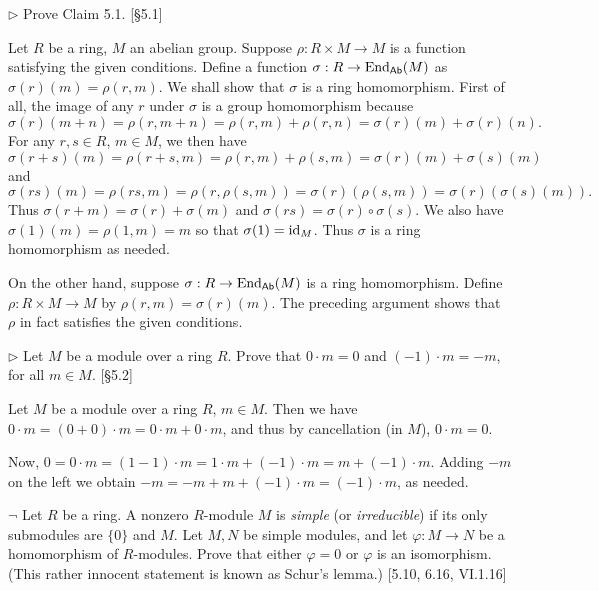 \begin{problem}
	$\triangleright$ Prove Claim 5.1. [\S 5.1]
\end{problem}

\begin{solution}
	Let $R$ be a ring, $M$ an abelian group. Suppose $\rho: R \times M \to M$ is a function satisfying the given conditions. Define a function $\sigma: R \to \mathrm{End}_{\mathsf{Ab}}(M)$ as $\sigma(r)(m) = \rho(r, m)$. We shall show that $\sigma$ is a ring homomorphism. First of all, the image of any $r$ under $\sigma$ is a group homomorphism because
	\[
		\sigma(r)(m + n) = \rho(r, m + n) = \rho(r, m) + \rho(r, n) = \sigma(r)(m) + \sigma(r)(n) \text{.}
	\]
	For any $r, s \in R$, $m \in M$, we then have
	\[
		\sigma(r + s)(m) = \rho(r + s, m) = \rho(r, m) + \rho(s, m) = \sigma(r)(m) + \sigma(s)(m)
	\]
	and
	\[
		\sigma(rs)(m) = \rho(rs, m) = \rho(r, \rho(s, m)) = \sigma(r)(\rho(s, m)) = \sigma(r)(\sigma(s)(m)) \text{.}
	\]
	Thus $\sigma(r + m) = \sigma(r) + \sigma(m)$ and $\sigma(rs) = \sigma(r) \circ \sigma(s)$. We also have $\sigma(1)(m) = \rho(1, m) = m$ so that $\sigma(1) = \mathrm{id}_M$. Thus $\sigma$ is a ring homomorphism as needed.
	
	On the other hand, suppose $\sigma: R \to \mathrm{End}_{\mathsf{Ab}}(M)$ is a ring homomorphism. Define $\rho: R \times M \to M$ by $\rho(r, m) = \sigma(r)(m)$. The preceding argument shows that $\rho$ in fact satisfies the given conditions.
\end{solution}

\begin{problem}
	$\triangleright$ Let $M$ be a module over a ring $R$. Prove that $0 \cdot m = 0$ and $(-1) \cdot m = -m$, for all $m \in M$. [\S 5.2]
\end{problem}

\begin{solution}
	Let $M$ be a module over a ring $R$, $m \in M$. Then we have $0 \cdot m = (0 + 0) \cdot m = 0 \cdot m + 0 \cdot m$, and thus by cancellation (in $M$), $0 \cdot m = 0$.
	
	Now, $0 = 0 \cdot m = (1 - 1) \cdot m = 1 \cdot m + (-1) \cdot m = m + (-1) \cdot m$. Adding $-m$ on the left we obtain $-m = -m + m + (-1) \cdot m = (-1) \cdot m$, as needed.
\end{solution}

\begin{problem}
	$\neg$ Let $R$ be a ring. A nonzero $R$-module $M$ is \emph{simple} (or \emph{irreducible}) if its only submodules are $\{0\}$ and $M$. Let $M, N$ be simple modules, and let $\varphi: M \to N$ be a homomorphism of $R$-modules. Prove that either $\varphi = 0$ or $\varphi$ is an isomorphism. (This rather innocent statement is known as Schur's lemma.) [5.10, 6.16, VI.1.16]
\end{problem}

